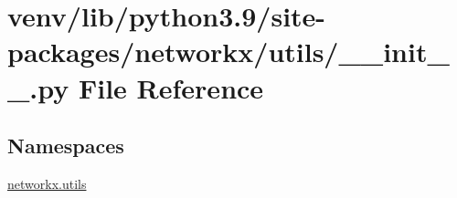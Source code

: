 \hypertarget{venv_2lib_2python3_89_2site-packages_2networkx_2utils_2____init_____8py}{}\section{venv/lib/python3.9/site-\/packages/networkx/utils/\+\_\+\+\_\+init\+\_\+\+\_\+.py File Reference}
\label{venv_2lib_2python3_89_2site-packages_2networkx_2utils_2____init_____8py}
\subsection*{Namespaces}
\begin{DoxyCompactItemize}
\item 
 \hyperlink{namespacenetworkx_1_1utils}{networkx.\+utils}
\end{DoxyCompactItemize}
